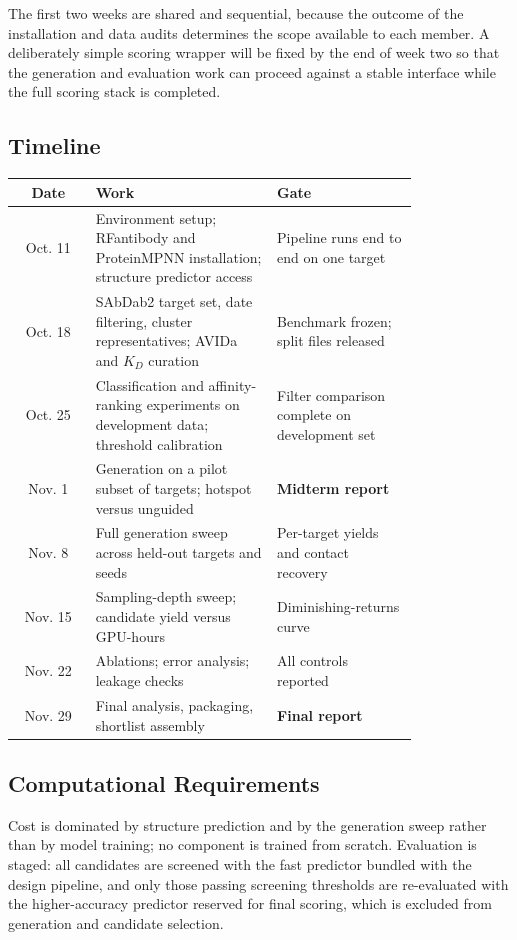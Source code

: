 \noindent The first two weeks are shared and sequential, because the outcome of the installation and data audits determines the scope available to each member.  A deliberately simple scoring wrapper will be fixed by the end of week two so that the generation and evaluation work can proceed against a stable interface while the full scoring stack is completed.

\subsection{Timeline}
\begin{center}
\small
\begin{tabular}{@{}c p{0.45\linewidth} p{0.35\linewidth}@{}}
\toprule
\textbf{Date} & \textbf{Work} & \textbf{Gate} \\
\midrule
Oct. 11 & Environment setup; RFantibody and ProteinMPNN installation; structure predictor access & Pipeline runs end to end on one target \\
\addlinespace
Oct. 18 & SAbDab2 target set, date filtering, cluster representatives; AVIDa and $K_D$ curation & Benchmark frozen; split files released \\
\addlinespace
Oct. 25 & Classification and affinity-ranking experiments on development data; threshold calibration & Filter comparison complete on development set \\
\addlinespace
Nov. 1 & Generation on a pilot subset of targets; hotspot versus unguided & \textbf{Midterm report} \\
\addlinespace
Nov. 8 & Full generation sweep across held-out targets and seeds & Per-target yields and contact recovery \\
\addlinespace
Nov. 15 & Sampling-depth sweep; candidate yield versus GPU-hours & Diminishing-returns curve \\
\addlinespace
Nov. 22 & Ablations; error analysis; leakage checks & All controls reported \\
\addlinespace
Nov. 29 & Final analysis, packaging, shortlist assembly & \textbf{Final report} \\
\bottomrule
\end{tabular}
\end{center}


\subsection{Computational Requirements}
Cost is dominated by structure prediction and by the generation sweep rather
than by model training; no component is trained from scratch. Evaluation is
staged: all candidates are screened with the fast predictor bundled with the
design pipeline, and only those passing screening thresholds are re-evaluated
with the higher-accuracy predictor reserved for final scoring, which is excluded
from generation and candidate selection.

